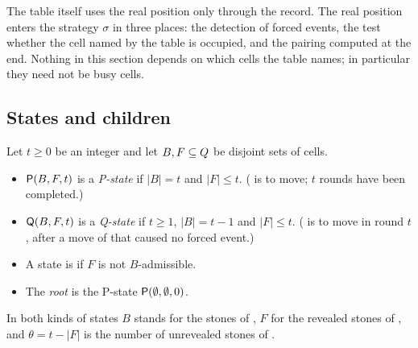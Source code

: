 The table itself uses the real position only through the record. The real position enters the strategy
$\sigma$ in three places: the detection of forced events, the test whether the cell named by the table is
occupied, and the pairing computed at the end. Nothing in this section depends on which cells the table
names; in particular they need not be busy cells.

\subsection{States and children}\label{sec:states}

\begin{definition}\label{def:states}\label{def:children}
Let $t\ge 0$ be an integer and let $B,F\subseteq Q$ be disjoint sets of cells.
\begin{itemize}[leftmargin=2.2em]
\item $\mathsf{P}(B,F,t)$ is a \emph{P-state} if $|B|=t$ and $|F|\le t$. (\Maker{} is to move; $t$ rounds have been
  completed.)
\item $\mathsf{Q}(B,F,t)$ is a \emph{Q-state} if $t\ge 1$, $|B|=t-1$ and $|F|\le t$. (\Breaker{} is to move in round
  $t$, after a move of \Maker{} that caused no forced event.)
\item A state is \VOID{} if $F$ is not $B$-admissible.
\item The \emph{root} is the P-state $\mathsf{P}(\emptyset,\emptyset,0)$.
\end{itemize}
In both kinds of states $B$ stands for the stones of \Breaker, $F$ for the revealed stones of \Maker, and
$\theta=t-|F|$ is the number of unrevealed stones of \Maker.


\end{definition}
